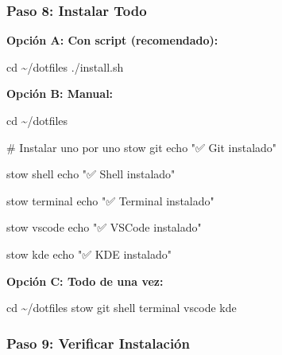 \documentclass[
  doc,
  floatsintext,
  longtable,
  a4paper,
  nolmodern,
  notxfonts,
  notimes,
  12pt,
  colorlinks=true,linkcolor=blue,citecolor=blue,urlcolor=blue]{apa7}
\newenvironment{Shaded}{\begin{snugshade}}{\end{snugshade}}
\newcommand{\BuiltInTok}[1]{\textcolor[rgb]{0.00,0.23,0.31}{#1}}
\newcommand{\CommentTok}[1]{\textcolor[rgb]{0.37,0.37,0.37}{#1}}
\newcommand{\ExtensionTok}[1]{\textcolor[rgb]{0.00,0.23,0.31}{#1}}
\newcommand{\NormalTok}[1]{\textcolor[rgb]{0.00,0.23,0.31}{#1}}
\newcommand{\StringTok}[1]{\textcolor[rgb]{0.13,0.47,0.30}{#1}}
\begin{document}
\subsubsection{Paso 8: Instalar Todo}\label{paso-8-instalar-todo}

\textbf{Opción A: Con script (recomendado):}

\begin{Shaded}
\begin{Highlighting}[]
\BuiltInTok{cd}\NormalTok{ \textasciitilde{}/dotfiles}
\ExtensionTok{./install.sh}
\end{Highlighting}
\end{Shaded}

\textbf{Opción B: Manual:}

\begin{Shaded}
\begin{Highlighting}[]
\BuiltInTok{cd}\NormalTok{ \textasciitilde{}/dotfiles}

\CommentTok{\# Instalar uno por uno}
\ExtensionTok{stow}\NormalTok{ git}
\BuiltInTok{echo} \StringTok{"✅ Git instalado"}

\ExtensionTok{stow}\NormalTok{ shell}
\BuiltInTok{echo} \StringTok{"✅ Shell instalado"}

\ExtensionTok{stow}\NormalTok{ terminal}
\BuiltInTok{echo} \StringTok{"✅ Terminal instalado"}

\ExtensionTok{stow}\NormalTok{ vscode}
\BuiltInTok{echo} \StringTok{"✅ VSCode instalado"}

\ExtensionTok{stow}\NormalTok{ kde}
\BuiltInTok{echo} \StringTok{"✅ KDE instalado"}
\end{Highlighting}
\end{Shaded}

\textbf{Opción C: Todo de una vez:}

\begin{Shaded}
\begin{Highlighting}[]
\BuiltInTok{cd}\NormalTok{ \textasciitilde{}/dotfiles}
\ExtensionTok{stow}\NormalTok{ git shell terminal vscode kde}
\end{Highlighting}
\end{Shaded}

\subsubsection{Paso 9: Verificar
Instalación}\label{paso-9-verificar-instalaciuxf3n}
\end{document}

